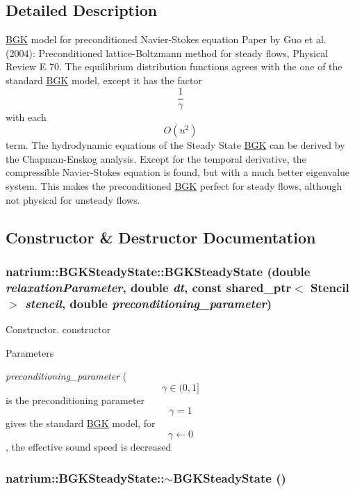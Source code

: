 \subsection{Detailed Description}
\hyperlink{classnatrium_1_1BGK}{BGK} model for preconditioned Navier-\/Stokes equation Paper by Guo et al. (2004): Preconditioned lattice-\/Boltzmann method for steady flows, Physical Review E 70. The equilibrium distribution functions agrees with the one of the standard \hyperlink{classnatrium_1_1BGK}{BGK} model, except it has the factor \[\frac{1}{\gamma}\] with each \[ O(u^2) \] term. The hydrodynamic equations of the Steady State \hyperlink{classnatrium_1_1BGK}{BGK} can be derived by the Chapman-\/Enskog analysis. Except for the temporal derivative, the compressible Navier-\/Stokes equation is found, but with a much better eigenvalue system. This makes the preconditioned \hyperlink{classnatrium_1_1BGK}{BGK} perfect for steady flows, although not physical for unsteady flows. 

\subsection{Constructor \& Destructor Documentation}
\hypertarget{classnatrium_1_1BGKSteadyState_aa8521523f8603fdc5a391d6e6388667c}{
\subsubsection[{BGKSteadyState}]{\setlength{\rightskip}{0pt plus 5cm}natrium::BGKSteadyState::BGKSteadyState (double {\em relaxationParameter}, \/  double {\em dt}, \/  const shared\_\-ptr$<$ {\bf Stencil} $>$ {\em stencil}, \/  double {\em preconditioning\_\-parameter})}}
\label{classnatrium_1_1BGKSteadyState_aa8521523f8603fdc5a391d6e6388667c}


Constructor. constructor


\begin{DoxyParams}{Parameters}
\item[{\em preconditioning\_\-parameter}](\[ \gamma \in (0,1] \] is the preconditioning parameter \[ \gamma = 1 \] gives the standard \hyperlink{classnatrium_1_1BGK}{BGK} model, for \[ \gamma \leftarrow 0 \], the effective sound speed is decreased \end{DoxyParams}
\hypertarget{classnatrium_1_1BGKSteadyState_ab2c58f1d6b964179a2abeb5f54aa5edc}{
\subsubsection[{$\sim$BGKSteadyState}]{\setlength{\rightskip}{0pt plus 5cm}natrium::BGKSteadyState::$\sim$BGKSteadyState ()}}
\label{classnatrium_1_1BGKSteadyState_ab2c58f1d6b964179a2abeb5f54aa5edc}


